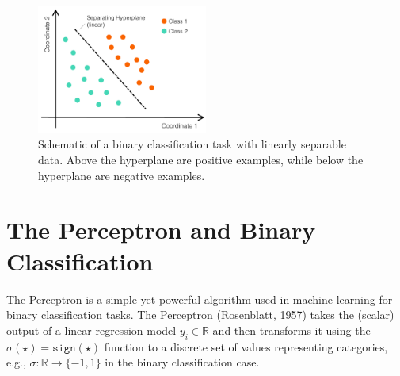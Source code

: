 \documentclass{article}[11pt]
\begin{document}
\begin{figure}
    \centering
	\includegraphics[width=0.5\textwidth]{./figs/Fig-LinearSeperableData-Hyperplane.pdf}
	\caption{Schematic of a binary classification task with linearly separable data.
    Above the hyperplane are positive examples, while below the hyperplane are negative examples.}\label{fig:linearhyperplane}
\end{figure}

\section{The Perceptron and Binary Classification}
The Perceptron \cite{Perceptron1960} is a simple yet powerful algorithm used in machine learning for binary classification tasks.
\href{https://en.wikipedia.org/wiki/Perceptron}{The Perceptron (Rosenblatt, 1957)} takes the (scalar) output of a linear regression model $y_{i}\in\mathbb{R}$ and then transforms 
it using the $\sigma(\star) = \texttt{sign}(\star)$ function to a discrete set of values representing categories, e.g., $\sigma:\mathbb{R}\rightarrow\{-1,1\}$ in the binary classification case. 
\end{document}
